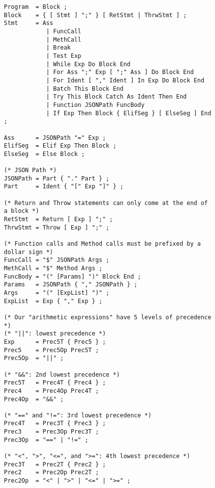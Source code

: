 \begin{figure}[H]\ContinuedFloat
    \begin{verbatim}
Program  = Block ;
Block    = { [ Stmt ] ";" } [ RetStmt | ThrwStmt ] ;
Stmt     = Ass
            | FuncCall
            | MethCall
            | Break
            | Test Exp
            | While Exp Do Block End
            | For Ass ";" Exp [ ";" Ass ] Do Block End
            | For Ident [ "," Ident ] In Exp Do Block End
            | Batch This Block End
            | Try This Block Catch As Ident Then End
            | Function JSONPath FuncBody
            | If Exp Then Block { ElifSeg } [ ElseSeg ] End ;

Ass      = JSONPath "=" Exp ;
ElifSeg  = Elif Exp Then Block ;
ElseSeg  = Else Block ;

(* JSON Path *)
JSONPath = Part { "." Part } ;
Part     = Ident { "[" Exp "]" } ;

(* Return and Throw statements can only come at the end of a block *)
RetStmt  = Return [ Exp ] ";" ;
ThrwStmt = Throw [ Exp ] ";" ;

(* Function calls and Method calls must be prefixed by a dollar sign *)
FuncCall = "$" JSONPath Args ;
MethCall = "$" Method Args ;
FuncBody = "(" [Params] ")" Block End ;
Params   = JSONPath { "," JSONPath } ;
Args     = "(" [ExpList] ")" ;
ExpList  = Exp { "," Exp } ;

(* Our "arithmetic expressions" have 5 levels of precedence *)
(* "||": lowest precedence *)
Exp      = Prec5T { Prec5 } ;
Prec5    = Prec5Op Prec5T ;
Prec5Op  = "||" ;

(* "&&": 2nd lowest precedence *)
Prec5T   = Prec4T { Prec4 } ;
Prec4    = Prec4Op Prec4T ;
Prec4Op  = "&&" ;

(* "==" and "!=": 3rd lowest precedence *)
Prec4T   = Prec3T { Prec3 } ;
Prec3    = Prec3Op Prec3T ;
Prec3Op  = "==" | "!=" ;

(* "<", ">", "<=", and ">=": 4th lowest precedence *)
Prec3T   = Prec2T { Prec2 } ;
Prec2    = Prec2Op Prec2T ;
Prec2Op  = "<" | ">" | "<=" | ">=" ;
    \end{verbatim}
\end{figure}

